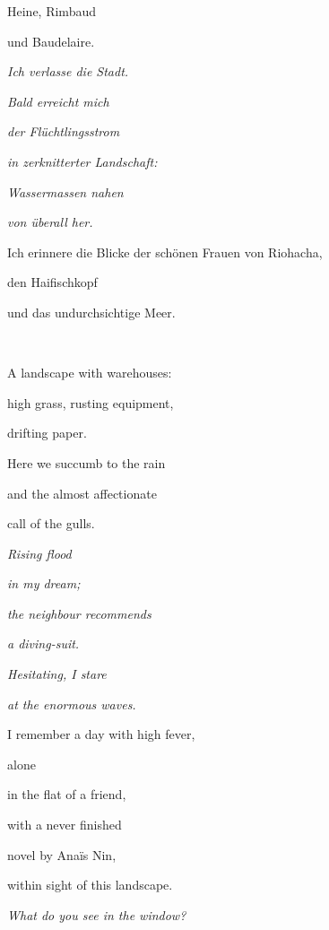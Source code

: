 \documentclass[a4paper]{article}
\begin{document}
Heine, Rimbaud

und Baudelaire.


\bigskip

{\itshape
Ich verlasse die Stadt.}

{\itshape
Bald erreicht mich }

{\itshape
der Flüchtlingsstrom}

{\itshape
in zerknitterter Landschaft:}

{\itshape
Wassermassen nahen }

{\itshape
von überall her.}


\bigskip

Ich erinnere die Blicke der schönen Frauen von Riohacha,

den Haifischkopf

und das undurchsichtige Meer.

~



\bigskip

A landscape with warehouses:

high grass, rusting equipment,

drifting paper.


\bigskip

Here we succumb to the rain 

and the almost affectionate 

call of the gulls.


\bigskip

{\itshape
Rising flood}

{\itshape
in my dream;}

{\itshape
the neighbour recommends}

{\itshape
a diving-suit.}

{\itshape
Hesitating, I stare}

{\itshape
at the enormous waves.}


\bigskip

I remember a day with high fever,

alone

in the flat of a friend,


\bigskip

with a never finished

novel by Anaïs Nin,

within sight of this landscape.


\bigskip

{\itshape
What do you see in the window?}
\end{document}

